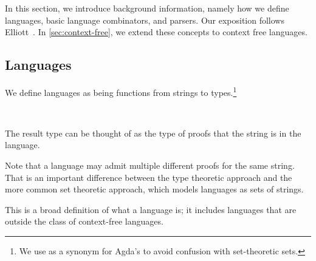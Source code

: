 In this section, we introduce background information, namely how we define languages, basic language combinators, and parsers. Our exposition follows Elliott~\cite{conal-languages}. In \cref{sec:context-free}, we extend these concepts to context free languages.

\subsection{Languages}

We define languages as being functions from strings to types.\footnote{We use  as a synonym for Agda's  to avoid confusion with set-theoretic sets.}%
\begin{code}[hide]%
\>[0]\<%
\\
\>[0][@{}l@{\AgdaIndent{0}}]%
\>[4]\AgdaSpace{}%
\AgdaSymbol{:}\AgdaSpace{}%
\<%
\end{code}
\begin{code}%
%
\>[4]\AgdaSpace{}%
\AgdaSymbol{=}\AgdaSpace{}%
\AgdaSpace{}%
\AgdaSpace{}%
\<%
\end{code}
The result type can be thought of as the type of proofs that the string is in the language.
\begin{remark}
Note that a language may admit multiple different proofs for the same string. That is an important difference between the type theoretic approach and the more common set theoretic approach, which models languages as sets of strings.
\end{remark}
This is a broad definition of what a language is; it includes languages that are outside the class of context-free languages. 
